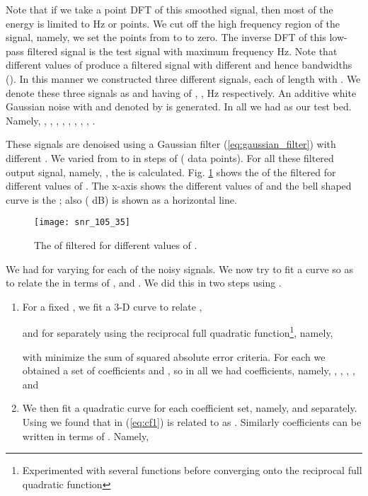 \documentclass[journal,onecolumn]{IEEEtran}
\begin{document}
Note that if we take a  point DFT of this smoothed signal, then most of the energy is
limited to  Hz or  points. We cut off the high frequency region of the signal, namely,
we set the points from   to 
to zero. The inverse DFT of this low-pass filtered signal is the test signal with maximum frequency 
 Hz. Note that different values of  produce a filtered signal with different  and 
hence bandwidths ().
In this manner we constructed three different signals, each  of length 
 with . We denote these three signals as
 and  having  of 
,
,
 Hz
respectively. 
An additive white Gaussian 
noise with  and  denoted by  is generated.
In all we had   as our test bed. Namely,
 , 
 , 
 , 
 , 
 , 
 , 
 , 
 , 
 .

 These signals  are denoised using a 
Gaussian filter (\ref{eq:gaussian_filter}) with different . 
We varied  from  to  in steps 
of  ( data points). For all 
these filtered output signal, namely, , the  is 
calculated. Fig. \ref{fig:snr_plot} shows the  of the filtered 
 for different values of . The x-axis shows 
the different values of  and the bell shaped curve is the 
; also  ( dB) is shown as a horizontal line. 
 \begin{figure} 
 \centerline{\texttt{[image: snr\_105\_35]}} 
 \caption{The  of filtered  for different values 
of .}
 \label{fig:snr_plot}
 \end{figure}
We had   for varying  for each of the  
noisy signals. We now try to fit a curve so as to relate the  in terms of 
,  and 
.  
We did this in two steps using \cite{web:curve_fit}.

\begin{enumerate}
 \item[Step 1] For a fixed ,  we fit a 3-D curve to relate , 
 
and  for   separately
using the reciprocal full quadratic function\footnote{Experimented with
several functions before converging onto the reciprocal full quadratic function}, namely, 

with minimize
the sum of squared absolute error criteria. 
For each  we obtained a set of coefficients 
 and , so in all we had  coefficients, namely, 
,
,
,
,
 and


\item [Step 2] We then fit a quadratic curve 
for each coefficient set, namely,   and  separately.
Using  we found that  in (\ref{eq:cf1}) is related to  as 
. 
Similarly coefficients
 can be written in terms of . Namely, 
 \end{enumerate}
\end{document}
